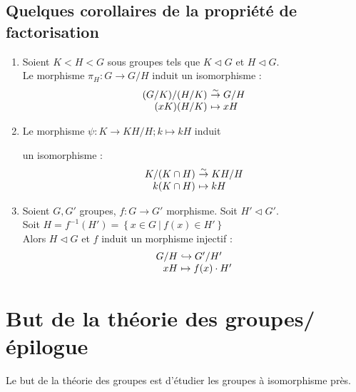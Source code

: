 \documentclass[a4paper,10pt]{report}
\newcommand{\set}[1]{\left\lbrace #1 \right\rbrace } %
\newcommand{\IZ}{\mathbb{Z}} %
\newcommand{\inj}{\hookrightarrow}
\newcommand{\bij}{\overset{\sim}{\to}} %
\newcommand{\pgcd}{\mathrm{pgcd}} %
\newcommand{\ppcm}{\mathrm{ppcm}}
\newcommand{\mfootnote}[1]{\up{(}\footnote{#1}\up{)}}
\newcommand{\such}{\ \Big| \ }
\begin{document}
  \section{Quelques corollaires de la propriété de factorisation}
   \begin{enumerate}
     \item 
       \begin{comment}
	 (Preuve 29/10/08 p2) 
       \end{comment}
       Soient $K < H < G$ sous groupes tels que $K \triangleleft G$ et
       $H \triangleleft G$.\\
       Le morphisme $\pi_H: G \to G/H$ induit un isomorphisme :
       $$
       \begin{array}[t]{r@{\ }l}
	 (G/K)/(H/K) &\bij G/H\\
	 (xK)(H/K) & \mapsto xH
       \end{array}
       $$

     \item Le morphisme $\psi : K \to KH/H; k \mapsto kH$ induit
       \begin{comment}
	 \mfootnote{Exemple montrant $n\IZ/\ppcm(n,m) \IZ \bij \pgcd(n,m) \IZ
	 /m\IZ$ : 05/11/08 p1} 
       \end{comment}
       un isomorphisme :
       $$
       \begin{array}[t]{r@{\ }l}
	 K/(K \cap H) & \bij KH/H \\
	 k(K \cap H) & \mapsto kH
       \end{array}$$

     \item 
       \begin{comment}
	 (Preuve : 29/10/08 p3, verso) 
       \end{comment}
       Soient $G, G'$ groupes, $f : G \to G'$ morphisme. Soit $H' 
       \triangleleft G'$.\\
       Soit $H = f^{-1}(H')=\set{x \in G \such f(x) \in H'}$\\
       Alors $H\triangleleft G$ et $f$ induit un morphisme injectif : 
       $$
       \begin{array}[t]{r@{\ }l}
	 G/H & \inj G'/H'\\
	 xH & \mapsto f(x)\cdot H'
       \end{array}
       $$
   \end{enumerate}

 \chapter{But de la théorie des groupes/épilogue}
  Le but de la théorie des groupes est d'étudier les groupes à isomorphisme
  près.
\end{document}
